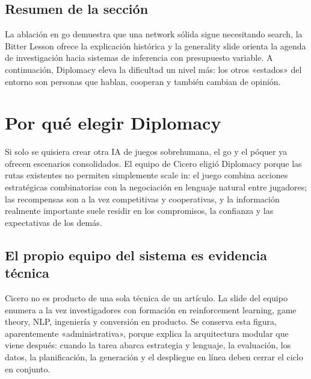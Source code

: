 \documentclass[a4paper]{article}
\begin{document}

\subsection{Resumen de la sección}

La ablación en go demuestra que una network sólida sigue necesitando search, la Bitter Lesson ofrece la explicación histórica y la generality slide orienta la agenda de investigación hacia sistemas de inferencia con presupuesto variable. A continuación, Diplomacy eleva la dificultad un nivel más: los otros «estados» del entorno son personas que hablan, cooperan y también cambian de opinión.
\section{Por qué elegir Diplomacy}

Si solo se quisiera crear otra IA de juegos sobrehumana, el go y el póquer ya ofrecen escenarios consolidados. El equipo de Cicero eligió Diplomacy porque las rutas existentes no permiten simplemente scale in: el juego combina acciones estratégicas combinatorias con la negociación en lenguaje natural entre jugadores; las recompensas son a la vez competitivas y cooperativas, y la información realmente importante suele residir en los compromisos, la confianza y las expectativas de los demás.

\subsection{El propio equipo del sistema es evidencia técnica}

Cicero no es producto de una sola técnica de un artículo. La slide del equipo enumera a la vez investigadores con formación en reinforcement learning, game theory, NLP, ingeniería y conversión en producto. Se conserva esta figura, aparentemente «administrativa», porque explica la arquitectura modular que viene después: cuando la tarea abarca estrategia y lenguaje, la evaluación, los datos, la planificación, la generación y el despliegue en línea deben cerrar el ciclo en conjunto.
\end{document}

